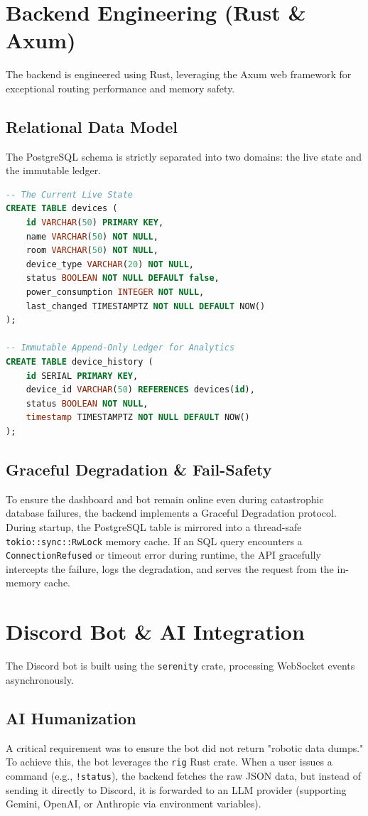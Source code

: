 \documentclass[12pt,a4paper]{article}
\begin{document}
\section{Backend Engineering (Rust \& Axum)}
The backend is engineered using Rust, leveraging the Axum web framework for exceptional routing performance and memory safety. 

\subsection{Relational Data Model}
The PostgreSQL schema is strictly separated into two domains: the live state and the immutable ledger.

\begin{lstlisting}[language=SQL, caption=PostgreSQL Schema Definition]
-- The Current Live State
CREATE TABLE devices (
    id VARCHAR(50) PRIMARY KEY,
    name VARCHAR(50) NOT NULL,
    room VARCHAR(50) NOT NULL,
    device_type VARCHAR(20) NOT NULL,
    status BOOLEAN NOT NULL DEFAULT false,
    power_consumption INTEGER NOT NULL,
    last_changed TIMESTAMPTZ NOT NULL DEFAULT NOW()
);

-- Immutable Append-Only Ledger for Analytics
CREATE TABLE device_history (
    id SERIAL PRIMARY KEY,
    device_id VARCHAR(50) REFERENCES devices(id),
    status BOOLEAN NOT NULL,
    timestamp TIMESTAMPTZ NOT NULL DEFAULT NOW()
);
\end{lstlisting}

\subsection{Graceful Degradation \& Fail-Safety}
To ensure the dashboard and bot remain online even during catastrophic database failures, the backend implements a Graceful Degradation protocol. During startup, the PostgreSQL table is mirrored into a thread-safe \texttt{tokio::sync::RwLock} memory cache. If an SQL query encounters a \texttt{ConnectionRefused} or timeout error during runtime, the API gracefully intercepts the failure, logs the degradation, and serves the request from the in-memory cache. 

\section{Discord Bot \& AI Integration}
The Discord bot is built using the \texttt{serenity} crate, processing WebSocket events asynchronously. 

\subsection{AI Humanization}
A critical requirement was to ensure the bot did not return "robotic data dumps." To achieve this, the bot leverages the \texttt{rig} Rust crate. When a user issues a command (e.g., \texttt{!status}), the backend fetches the raw JSON data, but instead of sending it directly to Discord, it is forwarded to an LLM provider (supporting Gemini, OpenAI, or Anthropic via environment variables). 
\end{document}
